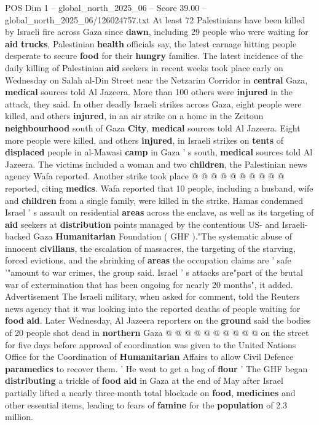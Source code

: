 \begin{textsample}{POS Dim 1 – global\_north\_2025\_06 – Score 39.00 – global\_north\_2025\_06/126024757.txt}  \label{ex:f1_pos_302}
At least 72 Palestinians have been killed by Israeli fire across Gaza since \textbf{dawn}, including 29 people who were waiting for \textbf{aid} \textbf{trucks}, Palestinian \textbf{health} officials say, the latest carnage hitting people desperate to secure \textbf{food} for their \textbf{hungry} families.
The latest incidence of the daily killing of Palestinian \textbf{aid} seekers in recent weeks took place early on Wednesday on Salah al-Din Street near the Netzarim Corridor in \textbf{central} Gaza, \textbf{medical} sources told Al Jazeera.
More than 100 others were \textbf{injured} in the attack, they said.
In other deadly Israeli strikes across Gaza, eight people were killed, and others \textbf{injured}, in an air strike on a home in the Zeitoun \textbf{neighbourhood} south of Gaza \textbf{City}, \textbf{medical} sources told Al Jazeera.
Eight more people were killed, and others \textbf{injured}, in Israeli strikes on \textbf{tents} of \textbf{displaced} people in al-Mawasi \textbf{camp} in Gaza ' s south, \textbf{medical} sources told Al Jazeera.
The victims included a woman and two \textbf{children}, the Palestinian news agency Wafa reported.
Another strike took place @ @ @ @ @ @ @ @ @ @ reported, citing \textbf{medics}.
Wafa reported that 10 people, including a husband, wife and \textbf{children} from a single family, were killed in the strike.
Hamas condemned Israel ' s assault on residential \textbf{areas} across the enclave, as well as its targeting of \textbf{aid} seekers at \textbf{distribution} points managed by the contentious US- and Israeli-backed Gaza \textbf{Humanitarian} Foundation ( GHF )."The systematic abuse of innocent \textbf{civilians}, the escalation of massacres, the targeting of the starving, forced evictions, and the shrinking of \textbf{areas} the occupation claims are ' safe '"amount to war crimes, the group said.
Israel ' s attacks are"part of the brutal war of extermination that has been ongoing for nearly 20 months", it added.
Advertisement The Israeli military, when asked for comment, told the Reuters news agency that it was looking into the reported deaths of people waiting for \textbf{food} \textbf{aid}.
Later Wednesday, Al Jazeera reporters on the \textbf{ground} said the bodies of 20 people shot dead in \textbf{northern} Gaza @ @ @ @ @ @ @ @ @ @ on the street for five days before approval of coordination was given to the United Nations Office for the Coordination of \textbf{Humanitarian} Affairs to allow Civil Defence \textbf{paramedics} to recover them. ' He went to get a bag of \textbf{flour} ' The GHF began \textbf{distributing} a trickle of \textbf{food} \textbf{aid} in Gaza at the end of May after Israel partially lifted a nearly three-month total blockade on \textbf{food}, \textbf{medicines} and other essential items, leading to fears of \textbf{famine} for the \textbf{population} of 2.3 million.

\end{textsample}
